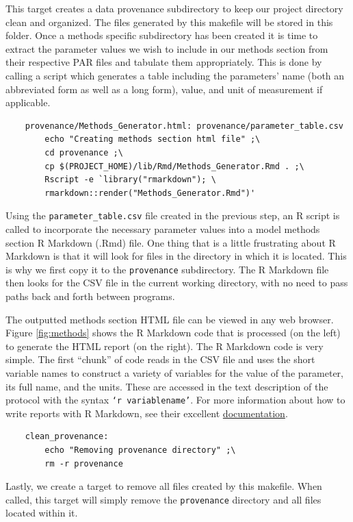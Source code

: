  This target creates a data provenance subdirectory to keep our project directory clean and organized. The files generated by this makefile will be stored in this folder.  Once a methods specific subdirectory has been created it is time to extract the parameter values we wish to include in our methods section from their respective PAR files and tabulate them appropriately. This is done by  calling a \bashn{} script which generates a table including the parameters' name (both an abbreviated form as well as a long form), value, and unit of measurement if applicable.

\begin{lstlisting}
	provenance/Methods_Generator.html: provenance/parameter_table.csv
		echo "Creating methods section html file" ;\
		cd provenance ;\
		cp $(PROJECT_HOME)/lib/Rmd/Methods_Generator.Rmd . ;\
		Rscript -e `library("rmarkdown"); \
		rmarkdown::render("Methods_Generator.Rmd")'
\end{lstlisting}

Using the \texttt{parameter_table.csv} file created in the previous step, an R script is called to incorporate the necessary parameter values into a model methods section R Markdown (.Rmd) file. One thing that is a little frustrating about R Markdown is that it will look for files in the directory in which it is located. This is why we first copy it to the \texttt{provenance} subdirectory. The R Markdown file then looks for the CSV file in the current working directory, with no need to pass paths back and forth between programs. 

The outputted methods section HTML file can be viewed in any web browser. Figure \autoref{fig:methods} shows the R Markdown code that is processed (on the left) to generate the HTML report (on the right). The R Markdown code is very simple. The first ``chunk'' of code reads in the CSV file and uses the short variable names to construct a variety of variables for the value of the parameter, its full name, and the units. These are accessed in the text description of the protocol with the syntax \texttt{`r variablename'}. For more information about how to write reports with R Markdown, see their excellent \href{http://rmarkdown.rstudio.com}{documentation}. 

\begin{lstlisting}
	clean_provenance:
		echo "Removing provenance directory" ;\
		rm -r provenance
\end{lstlisting}

Lastly, we create a target to remove all files created by this makefile. When called, this target will simply remove the \texttt{provenance} directory and all files located within it.



